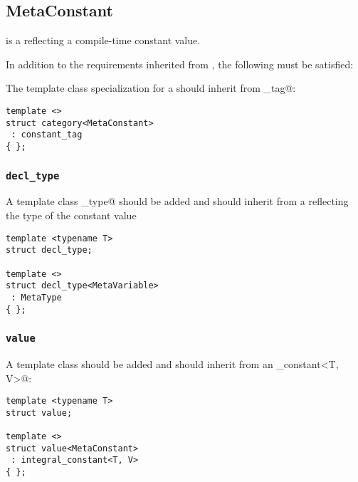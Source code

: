 \subsection{MetaConstant}
\label{concept-MetaConstant}

 is a  reflecting a compile-time constant value.

In addition to the requirements inherited from , the following must
be satisfied:

The \verb@category@ template class specialization for a  should
inherit from \verb@constant_tag@:

\begin{verbatim}
template <>
struct category<MetaConstant>
 : constant_tag
{ };
\end{verbatim}

\subsubsection{\texttt{decl\_type}}

A template class \verb@decl_type@ should be added and should inherit
from a  reflecting the type of the constant value

\begin{verbatim}
template <typename T>
struct decl_type;

template <>
struct decl_type<MetaVariable>
 : MetaType
{ };
\end{verbatim}

\subsubsection{\texttt{value}}

A template class \verb@value@ should be added and should inherit
from an \verb@integral_constant<T, V>@:

\begin{verbatim}
template <typename T>
struct value;

template <>
struct value<MetaConstant>
 : integral_constant<T, V>
{ };
\end{verbatim}

